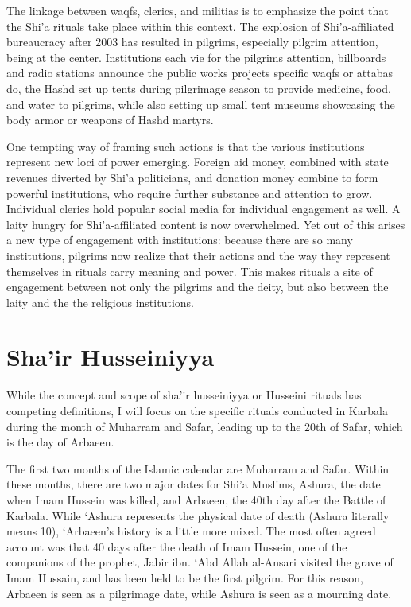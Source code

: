 The linkage between waqfs, clerics, and militias is to emphasize the point that the Shi'a rituals take place within this context. The explosion of Shi'a-affiliated bureaucracy after 2003 has resulted in pilgrims, especially pilgrim attention, being at the center. Institutions each vie for the pilgrims attention, billboards and radio stations announce the public works projects specific waqfs or attabas do, the Hashd set up tents during pilgrimage season to provide medicine, food, and water to pilgrims, while also setting up small tent museums showcasing the body armor or weapons of Hashd martyrs. 

One tempting way of framing such actions is that the various institutions represent new loci of power emerging. Foreign aid money, combined with state revenues diverted by Shi'a politicians, and donation money combine to form powerful institutions, who require further substance and attention to grow. Individual clerics hold popular social media \cite{ann_wainscott_engaging_2019} for individual engagement as well. A laity hungry for Shi'a-affiliated content is now overwhelmed. Yet out of this arises a new type of engagement with institutions: because there are so many institutions, pilgrims now realize that their actions and the way they represent themselves in rituals carry meaning and power. This makes rituals a site of engagement between not only the pilgrims and the deity, but also between the laity and the the religious institutions. 

\section{Sha'ir Husseiniyya}
While the concept and scope of sha’ir husseiniyya or Husseini rituals has competing definitions, I will focus on the specific rituals conducted in Karbala during the month of Muharram and Safar, leading up to the 20th of Safar, which is the day of Arbaeen. 

The first two months of the Islamic calendar are Muharram and Safar. Within these months, there are two major dates for Shi’a Muslims, Ashura, the date when Imam Hussein was killed, and Arbaeen, the 40th day after the Battle of Karbala. While ‘Ashura represents the physical date of death (Ashura literally means 10), ‘Arbaeen’s history is a little more mixed. The most often agreed account was that 40 days after the death of Imam Hussein, one of the companions of the prophet, Jabir ibn. ‘Abd Allah al-Ansari visited the grave of Imam Hussain, and has been held to be the first pilgrim. For this reason, Arbaeen is seen as a pilgrimage date, while Ashura is seen as a mourning date. 

